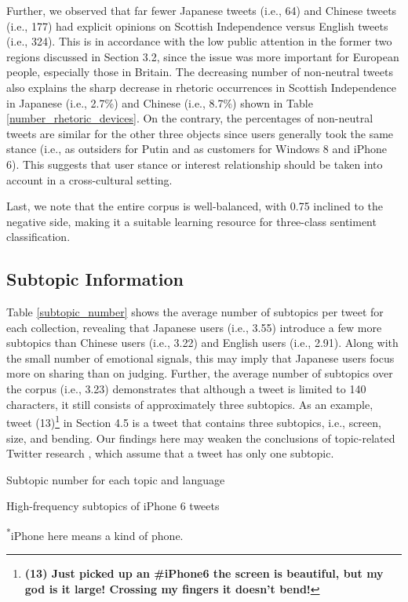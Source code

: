 \documentclass[english]{jnlp_1.4}
\begin{document}
Further, we observed that far fewer Japanese tweets (i.e., 64) and Chinese tweets (i.e., 177) had explicit opinions on Scottish Independence versus English tweets (i.e., 324). This is in accordance with the low public attention in the former two regions discussed in Section 3.2, since the issue was more important for European people, especially those in Britain. The decreasing number of non-neutral tweets also explains the sharp decrease in rhetoric occurrences in Scottish Independence in Japanese (i.e., 2.7\%) and Chinese (i.e., 8.7\%) shown in Table \ref{number_rhetoric_devices}. On the contrary, the percentages of non-neutral tweets are similar for the other three objects since users generally took the same stance (i.e., as outsiders for Putin and as customers for Windows 8 and iPhone 6). This suggests that user stance or interest relationship should be taken into account in a cross-cultural setting.

Last, we note that the entire corpus is well-balanced, with 0.75 inclined to the negative side, making it a suitable learning resource for three-class sentiment classification.


\subsection{Subtopic Information}

Table \ref{subtopic_number} shows the average number of subtopics per tweet for each collection, revealing that Japanese users (i.e., 3.55) introduce a few more subtopics than Chinese users (i.e., 3.22) and English users (i.e., 2.91). Along with the small number of emotional signals, this may imply that Japanese users focus more on sharing than on judging. Further, the average number of subtopics over the corpus (i.e., 3.23) demonstrates that although a tweet is limited to 140 characters, it still consists of approximately three subtopics. As an example, tweet (13)\footnote{\textbf{(13) Just picked up an \#iPhone6 the screen is beautiful, but my god is it large! Crossing my fingers it doesn't bend!}} in Section 4.5 is a tweet that contains three subtopics, i.e., screen, size, and bending. Our findings here may weaken the conclusions of topic-related Twitter research \cite{Si13}, which assume that a tweet has only one subtopic. 

\begin{table}[b]
\caption{Subtopic number for each topic and language}
\label{subtopic_number}

\end{table}
\begin{table}[b]
\caption{High-frequency subtopics of iPhone 6 tweets}
\label{subtopic_I6}

\vspace{4pt}\small\textsuperscript{*}iPhone here means a kind of phone.
\end{table}
\end{document}
